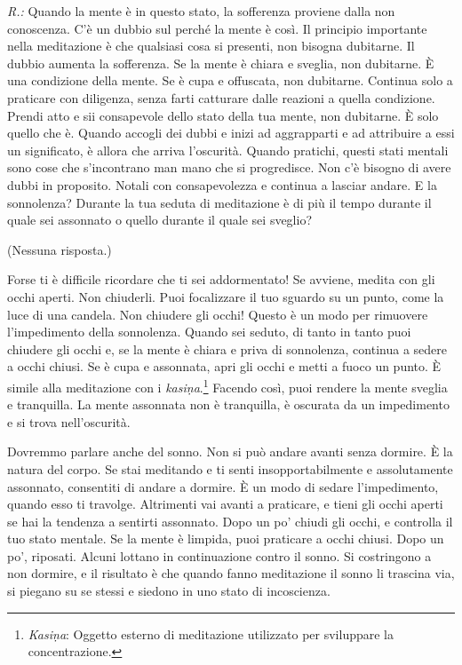 \emph{R.:} Quando la mente è in questo stato, la sofferenza proviene dalla non
conoscenza. C'è un dubbio sul perché la mente è così. Il principio
importante nella meditazione è che qualsiasi cosa si presenti, non
bisogna dubitarne. Il dubbio aumenta la sofferenza. Se la mente è chiara
e sveglia, non dubitarne. È una condizione della mente. Se è cupa e
offuscata, non dubitarne. Continua solo a praticare con diligenza, senza
farti catturare dalle reazioni a quella condizione. Prendi atto e sii
consapevole dello stato della tua mente, non dubitarne. È solo quello
che è. Quando accogli dei dubbi e inizi ad aggrapparti e ad attribuire a
essi un significato, è allora che arriva l'oscurità. Quando pratichi,
questi stati mentali sono cose che s'incontrano man mano che si
progredisce. Non c'è bisogno di avere dubbi in proposito. Notali con
consapevolezza e continua a lasciar andare. E la sonnolenza? Durante la
tua seduta di meditazione è di più il tempo durante il quale sei
assonnato o quello durante il quale sei sveglio?

(Nessuna risposta.)

Forse ti è difficile ricordare che ti sei addormentato! Se avviene,
medita con gli occhi aperti. Non chiuderli. Puoi focalizzare il tuo
sguardo su un punto, come la luce di una candela. Non chiudere gli
occhi! Questo è un modo per rimuovere l'impedimento della sonnolenza.
Quando sei seduto, di tanto in tanto puoi chiudere gli occhi e, se la
mente è chiara e priva di sonnolenza, continua a sedere a occhi chiusi.
Se è cupa e assonnata, apri gli occhi e metti a fuoco un punto. È simile
alla meditazione con i \emph{kasiṇa}.\footnote{\emph{Kasiṇa}: Oggetto
  esterno di meditazione utilizzato per sviluppare la concentrazione.}
Facendo così, puoi rendere la mente sveglia e tranquilla. La mente
assonnata non è tranquilla, è oscurata da un impedimento e si trova
nell'oscurità.

Dovremmo parlare anche del sonno. Non si può andare avanti senza
dormire. È la natura del corpo. Se stai meditando e ti senti
insopportabilmente e assolutamente assonnato, consentiti di andare a
dormire. È un modo di sedare l'impedimento, quando esso ti travolge.
Altrimenti vai avanti a praticare, e tieni gli occhi aperti se hai la
tendenza a sentirti assonnato. Dopo un po' chiudi gli occhi, e controlla
il tuo stato mentale. Se la mente è limpida, puoi praticare a occhi
chiusi. Dopo un po', riposati. Alcuni lottano in continuazione contro il
sonno. Si costringono a non dormire, e il risultato è che quando fanno
meditazione il sonno li trascina via, si piegano su se stessi e siedono
in uno stato di incoscienza.

